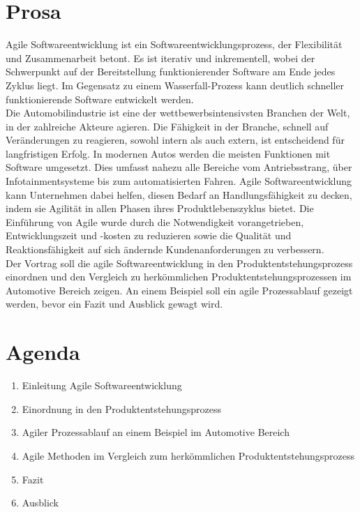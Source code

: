 \section*{Prosa}\label{prosa}
Agile Softwareentwicklung ist ein Softwareentwicklungsprozess, der Flexibilität und Zusammenarbeit betont. Es ist iterativ und inkrementell, wobei der Schwerpunkt auf der Bereitstellung funktionierender Software am Ende jedes Zyklus liegt. Im Gegensatz zu einem Wasserfall-Prozess kann deutlich schneller funktionierende Software entwickelt werden.\\

Die Automobilindustrie ist eine der wettbewerbsintensivsten Branchen der Welt, in der zahlreiche Akteure agieren. Die Fähigkeit in der Branche, schnell auf Veränderungen zu reagieren, sowohl intern als auch extern, ist entscheidend für langfristigen Erfolg. In modernen Autos werden die meisten Funktionen mit Software umgesetzt. Dies umfasst nahezu alle Bereiche vom Antriebsstrang, über Infotainmentsysteme bis zum automatisierten Fahren. Agile Softwareentwicklung kann Unternehmen dabei helfen, diesen Bedarf an Handlungsfähigkeit zu decken, indem sie Agilität in allen Phasen ihres Produktlebenszyklus bietet. Die Einführung von Agile wurde durch die Notwendigkeit vorangetrieben, Entwicklungszeit und -kosten zu reduzieren sowie die Qualität und Reaktionsfähigkeit auf sich ändernde Kundenanforderungen zu verbessern. \cite{Schlosser2016} \cite{katumba2014}\\

Der Vortrag \glqq\titleDocument\grqq{} soll die agile Softwareentwicklung in den Produktentstehungsprozess einordnen und den Vergleich zu herkömmlichen Produktentstehungsprozessen im Automotive Bereich zeigen. An einem Beispiel soll ein agile Prozessablauf gezeigt werden, bevor ein Fazit und Ausblick gewagt wird.\\

\section*{Agenda}
\begin{enumerate}
	\item Einleitung Agile Softwareentwicklung
	\item Einordnung in den Produktentstehungsprozess
	\item Agiler Prozessablauf an einem Beispiel im Automotive Bereich
	\item Agile Methoden im Vergleich zum herkömmlichen Produktentstehungsprozess
	\item Fazit
	\item Ausblick
\end{enumerate}